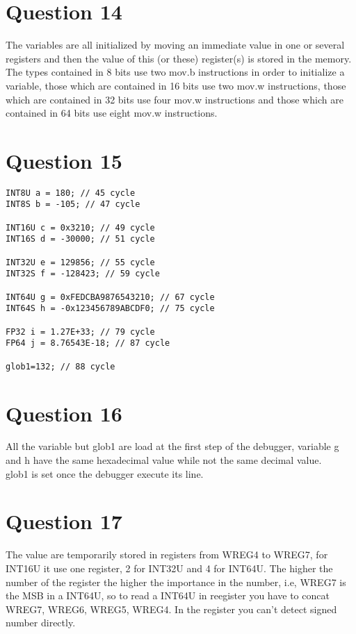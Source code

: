 \documentclass[a4paper,10pt]{article}
\begin{document}
\section*{Question 14}
The variables are all initialized by moving an immediate value in one or several registers and then the value of  this (or these) register(s) is stored in the memory. The types contained in 8 bits use two mov.b instructions in order to initialize a variable, those which are contained in 16 bits use two mov.w instructions, those which are contained in 32 bits use four mov.w instructions and those which are contained in 64 bits use eight mov.w instructions.

\section*{Question 15}
\begin{verbatim}
INT8U a = 180; // 45 cycle
INT8S b = -105; // 47 cycle

INT16U c = 0x3210; // 49 cycle
INT16S d = -30000; // 51 cycle

INT32U e = 129856; // 55 cycle
INT32S f = -128423; // 59 cycle

INT64U g = 0xFEDCBA9876543210; // 67 cycle
INT64S h = -0x123456789ABCDF0; // 75 cycle

FP32 i = 1.27E+33; // 79 cycle
FP64 j = 8.76543E-18; // 87 cycle

glob1=132; // 88 cycle
\end{verbatim}

\section*{Question 16}
All the variable but glob1 are load at the first step of the debugger, variable g and h have the same hexadecimal value while not the same decimal value.\\
glob1 is set once the debugger execute its line.

\section*{Question 17}
The value are temporarily stored in registers from WREG4 to WREG7, for INT16U it use one register, 2 for INT32U and 4 for INT64U. The higher the number of the register the higher the importance in the number, i.e, WREG7 is the MSB in a INT64U, so to read a INT64U in reegister you have to concat WREG7, WREG6, WREG5, WREG4.
In the register you can't detect signed number directly.
\end{document}
